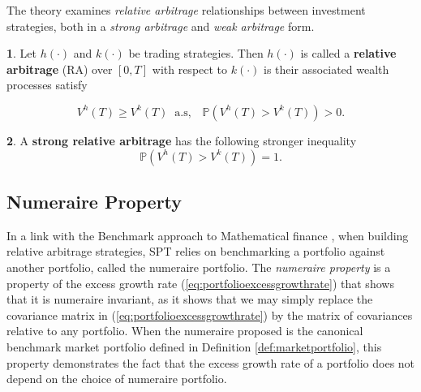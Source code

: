 \documentclass[british]{amsart} \usepackage{lmodern}
\numberwithin{equation}{section} \numberwithin{figure}{section}
\theoremstyle{plain} \newtheorem{thm}{\protect\theoremname}[section]
\theoremstyle{definition} \newtheorem{defn}[thm]{\protect\definitionname}
\theoremstyle{plain} \newtheorem{assumption}[thm]{\protect\assumptionname}
\theoremstyle{plain} \newtheorem{lem}[thm]{\protect\lemmaname}
\theoremstyle{plain} \newtheorem{prop}[thm]{\protect\propositionname}
\theoremstyle{remark} \newtheorem{rem}[thm]{\protect\remarkname}
\theoremstyle{plain} \newtheorem{cor}[thm]{\protect\corollaryname}
\begin{document}
The theory examines \textit{relative arbitrage} relationships between investment
strategies, both in a \textit{strong arbitrage} and \textit{weak arbitrage}
form.

\begin{defn}
  Let $h(\cdot)$ and $k(\cdot)$ be trading strategies. Then
  $h(\cdot)$ is called a \textbf{relative arbitrage} (RA) over
  $[0,T]$ with respect to $k(\cdot)$ is their associated wealth
  processes satisfy

  \begin{equation}
    V^{h}(T)\ge V^{k}(T)\;\;\text{a.s},\;\;\;\mathbb{P}(V^{h}(T)>V^{k}(T))>0.
  \end{equation}
\end{defn}

\begin{defn}
  A \textbf{strong relative arbitrage} has the following stronger inequality
  \begin{equation}
    \mathbb{P}(V^{h}(T)>V^{k}(T))=1.
  \end{equation}
\end{defn}

\subsection{Numeraire Property}

In a link with the Benchmark approach to Mathematical finance \cite{platen2006},
when building relative arbitrage strategies, SPT relies on benchmarking a
portfolio against another portfolio, called the numeraire portfolio. The
\textit{numeraire property} is a property of the excess growth rate
(\ref{eq:portfolioexcessgrowthrate}) that shows that it is numeraire invariant,
as it shows that we may simply replace the covariance matrix in
(\ref{eq:portfolioexcessgrowthrate}) by the matrix of covariances relative to
any portfolio. When the numeraire proposed is the canonical benchmark market
portfolio defined in Definition \ref{def:marketportfolio}, this property
demonstrates the fact that the excess growth rate of a portfolio does not depend
on the choice of numeraire portfolio.
\end{document}
